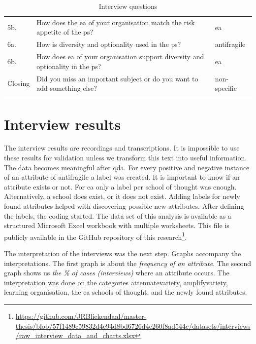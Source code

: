 \begin{table}[H]
{\begin{tabular}{@{}p{}p{}p{}@{}}
			5b. & How does the \acrshort{ea} of your organisation match the risk appetite of the \gls{ps}?
			& \acrshort{ea} \\%
			6a. & How is \gls{diversity} and \gls{optionality} used in the \gls{ps}? & \Gls{antifragile} \\%
			6b. & How does \acrshort{ea} of your organisation support \gls{diversity} and \gls{optionality} in the \gls{ps}? & \acrshort{ea} \\%
			Closing & Did you miss an important subject or do you want to add something else? & non-specific \\%
			\bottomrule
		\end{tabular}
	}%
		\caption[Interview questions]{Interview questions}
		\label{tab:interviewquestions}
\end{table}
\section{Interview results}
\label{sec:interviewresults}
The interview results are recordings and transcriptions. It is impossible to use these results for validation unless we transform this text into useful information. The data becomes meaningful after \acrfull{qda}. For every positive and negative instance of an \gls{attribute} of \gls{antifragile} a label was created. It is important to know if an \gls{attribute} exists or not. For \acrshort{ea} only a label per school of thought was enough. Alternatively, a school does exist, or it does not exist. Adding labels for newly found attributes helped with discovering possible new attributes. After defining the labels, the coding started. The data set of this analysis is available as a structured Microsoft Excel workbook with multiple worksheets. This file is publicly available in the GitHub repository of this research\footnote{\url{https://github.com/JRBliekendaal/master-thesis/blob/57f1489c59832d4c94d8bd6726d4e260f8ad544e/datasets/interviews/raw_interview_data_and_charts.xlsx}}.  

The interpretation of the interviews was the next step. Graphs accompany the interpretations. The first graph is about the \textit{frequency of an \gls{attribute}}. The second graph shows us \textit{the \% of cases (interviews)} where an \gls{attribute} occurs. The interpretation was done on the categories \gls{attenuatevariety}, \gls{amplifyvariety}, learning organisation, the \acrlong{ea} schools of thought, and the newly found \glspl{attribute}.
